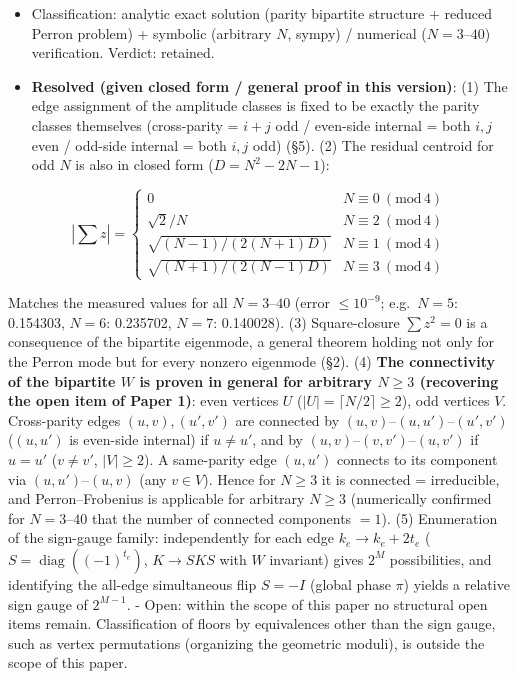 \documentclass[
  a4paper,
]{ltjsarticle}
\providecommand{\tightlist}{%
  \setlength{\itemsep}{0pt}\setlength{\parskip}{0pt}}
\begin{document}
\begin{itemize}
\tightlist
\item
  Classification: analytic exact solution (parity bipartite structure +
  reduced Perron problem) + symbolic (arbitrary \(N\), sympy) /
  numerical (\(N=3\)--\(40\)) verification. Verdict: retained.
\item
  \textbf{Resolved (given closed form / general proof in this version)}:
  (1) The edge assignment of the amplitude classes is fixed to be
  exactly the parity classes themselves (cross-parity = \(i+j\) odd /
  even-side internal = both \(i,j\) even / odd-side internal = both
  \(i,j\) odd) (§5). (2) The residual centroid for odd \(N\) is also in
  closed form (\(D=N^2-2N-1\)):
\end{itemize}

\[|\textstyle\sum z|=\begin{cases}0&N\equiv0\ (\mathrm{mod}\,4)\\[1mm] \sqrt2/N&N\equiv2\ (\mathrm{mod}\,4)\\[1mm] \sqrt{(N-1)/(2(N+1)D)}&N\equiv1\ (\mathrm{mod}\,4)\\[1mm] \sqrt{(N+1)/(2(N-1)D)}&N\equiv3\ (\mathrm{mod}\,4)\end{cases}\]

Matches the measured values for all \(N=3\)--\(40\) (error
\(\le10^{-9}\); e.g.~\(N=5\): 0.154303, \(N=6\): 0.235702, \(N=7\):
0.140028). (3) Square-closure \(\sum z^2=0\) is a consequence of the
bipartite eigenmode, a general theorem holding not only for the Perron
mode but for every nonzero eigenmode (§2). (4) \textbf{The connectivity
of the bipartite \(W\) is proven in general for arbitrary \(N\ge3\)
(recovering the open item of Paper 1)}: even vertices \(U\)
(\(|U|=\lceil N/2\rceil\ge2\)), odd vertices \(V\). Cross-parity edges
\((u,v),(u',v')\) are connected by \((u,v)\)--\((u,u')\)--\((u',v')\)
(\((u,u')\) is even-side internal) if \(u\neq u'\), and by
\((u,v)\)--\((v,v')\)--\((u,v')\) if \(u=u'\) (\(v\neq v'\),
\(|V|\ge2\)). A same-parity edge \((u,u')\) connects to its component
via \((u,u')\)--\((u,v)\) (any \(v\in V\)). Hence for \(N\ge3\) it is
connected = irreducible, and Perron--Frobenius is applicable for
arbitrary \(N\ge3\) (numerically confirmed for \(N=3\)--\(40\) that the
number of connected components \(=1\)). (5) Enumeration of the
sign-gauge family: independently for each edge \(k_e\to k_e+2t_e\)
(\(S=\operatorname{diag}((-1)^{t_e})\), \(K\to SKS\) with \(W\)
invariant) gives \(2^M\) possibilities, and identifying the all-edge
simultaneous flip \(S=-I\) (global phase \(\pi\)) yields a relative sign
gauge of \(2^{M-1}\). - Open: within the scope of this paper no
structural open items remain. Classification of floors by equivalences
other than the sign gauge, such as vertex permutations (organizing the
geometric moduli), is outside the scope of this paper.
\end{document}
